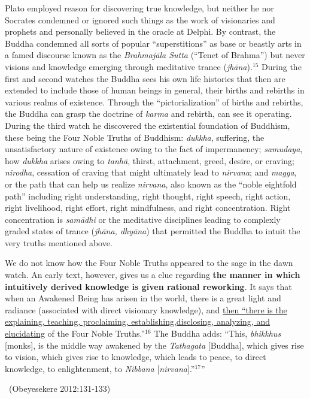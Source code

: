 \begin{myquote}
Plato employed reason for discovering true knowledge, but neither he nor Socrates condemned or ignored such things as the work of visionaries and prophets and personally believed in the oracle at Delphi. By contrast, the Buddha condemned all sorts of popular “superstitions” as base or beastly arts in a famed discourse known as the \textit{Brahmajāla Sutta} (“Tenet of Brahma”) but never visions and knowledge emerging through meditative trance (\textit{jhāna}).$^{15}$ During the first and second watches the Buddha sees his own life histories that then are extended to include those of human beings in general, their births and rebirths in various realms of existence. Through the “pictorialization” of births and rebirths, the Buddha can grasp the doctrine of \textit{karma} and rebirth, can see it operating. During the third watch he discovered the existential foundation of Buddhism, these being the Four Noble Truths of Buddhism: \textit{dukkha}, suffering, the unsatisfactory nature of existence owing to the fact of impermanency; \textit{samudaya}, how \textit{dukkha} arises owing to \textit{tanhā}, thirst, attachment, greed, desire, or craving; \textit{nirodha}, cessation of craving that might ultimately lead to \textit{nirvana}; and \textit{magga}, or the path that can help us realize \textit{nirvana}, also known as the “noble eightfold path” including right understanding, right thought, right speech, right action, right livelihood, right effort, right mindfulness, and right concentration. Right concentration is \textit{samādhi} or the meditative disciplines leading to complexly graded states of trance (\textit{jhāna, dhyāna}) that permitted the Buddha to intuit the very truths mentioned above.
\end{myquote}

\begin{myquote}
We do not know how the Four Noble Truths appeared to the sage in the dawn watch. An early text, however, gives us a clue regarding \textbf{the manner in which intuitively derived knowledge is given rational reworking}. It says that when an Awakened Being has arisen in the world, there is a great light and radiance (associated with direct visionary knowledge), and \underline{then “there is the explaining, teaching, proclaiming, establishing,}\break \underline{disclosing, analyzing, and elucidating} of the Four Noble Truths.”$^{16}$ The Buddha adds: “This, \textit{bhikkhus} [monks], is the middle way awakened by the \textit{Tathagata} [Buddha], which gives rise to vision, which gives rise to knowledge, which leads to peace, to direct knowledge, to enlightenment, to \textit{Nibbana} [\textit{nirvana}].”$^{17}$” 

~\hfill (Obeyesekere 2012:131-133)
\end{myquote}

